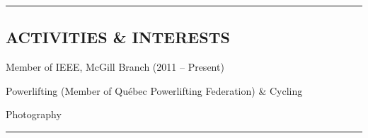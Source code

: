 \documentclass[10pt,letterpaper]{article}
\newenvironment{indentsection}[1]%
{\begin{list}{}%
	{\setlength{\leftmargin}{#1}}%
	\item[]%
}
{\end{list}}
\begin{document}
\hrule
\vspace{-0.4em}
\subsection*{ACTIVITIES \& INTERESTS}

\begin{indentsection}{\parindent}
\begin{description*}
        \item[]Member of IEEE, McGill Branch (2011 -- Present)
        \item[]Powerlifting (Member of Qu\'{e}bec Powerlifting Federation) \& Cycling
        \item[]Photography
\end{description*}
\end{indentsection}

\hrule
\vspace{-0.4em}
\end{document}
